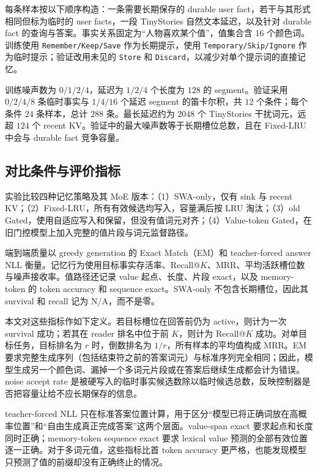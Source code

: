\documentclass[letterpaper]{article}
\begin{document}
每条样本按以下顺序构造：一条需要长期保存的 durable user fact，若干与其形式相同但标为临时的 user facts，一段 TinyStories 自然文本延迟，以及针对 durable fact 的查询与答案。事实关系固定为“人物喜欢某个值”，值集合含 $16$ 个颜色词。训练使用 \texttt{Remember/Keep/Save} 作为长期提示，使用 \texttt{Temporary/Skip/Ignore} 作为临时提示；验证改用未见的 \texttt{Store} 和 \texttt{Discard}，以减少对单个提示词的直接记忆。

训练噪声数为 $0/1/2/4$，延迟为 $1/2/4$ 个长度为 $128$ 的 segment。验证采用 $0/2/4/8$ 条临时事实与 $1/4/16$ 个延迟 segment 的笛卡尔积，共 $12$ 个条件；每个条件 $24$ 条样本，总计 $288$ 条。最长延迟约为 $2048$ 个 TinyStories 干扰词元，远超 $124$ 个 recent KV。验证中的最大噪声数等于长期槽位总数，且在 Fixed-LRU 中会与 durable fact 竞争容量。

\subsection{对比条件与评价指标}

实验比较四种记忆策略及其 MoE 版本：（1）SWA-only，仅有 sink 与 recent KV；（2）Fixed-LRU，所有有效候选均写入，容量满后按 LRU 淘汰；（3）old Gated，使用自适应写入和保留，但没有值词元对齐；（4）Value-token Gated，在旧门控模型上加入完整的值片段与词元监督路径。

端到端质量以 greedy generation 的 Exact Match（EM）和 teacher-forced answer NLL 衡量。记忆行为使用目标事实存活率、Recall@$K$、MRR、平均活跃槽位数与噪声接收率。值路径还记录 value 起点、长度、片段 exact，以及 memory-token 的 token accuracy 和 sequence exact。SWA-only 不包含长期槽位，因此其 survival 和 recall 记为 N/A，而不是零。

本文对这些指标作如下定义。若目标槽位在回答前仍为 active，则计为一次 survival 成功；若其在 reader 排名中位于前 $K$，则计为 Recall@$K$ 成功。对单目标任务，目标排名为 $r$ 时，倒数排名为 $1/r$，所有样本的平均值构成 MRR。EM 要求完整生成序列（包括结束符之前的答案词元）与标准序列完全相同；因此，模型生成另一个颜色词、漏掉一个多词元片段或在答案后继续生成都会计为错误。noise accept rate 是被硬写入的临时事实候选数除以临时候选总数，反映控制器是否把容量让给不应长期保存的信息。

teacher-forced NLL 只在标准答案位置计算，用于区分“模型已将正确词放在高概率位置”和“自由生成真正完成答案”这两个层面。value-span exact 要求起点和长度同时正确；memory-token sequence exact 要求 lexical value 预测的全部有效位置逐一正确。对于多词元值，这些指标比首 token accuracy 更严格，也能发现模型只预测了值的前缀却没有正确终止的情况。
\end{document}
